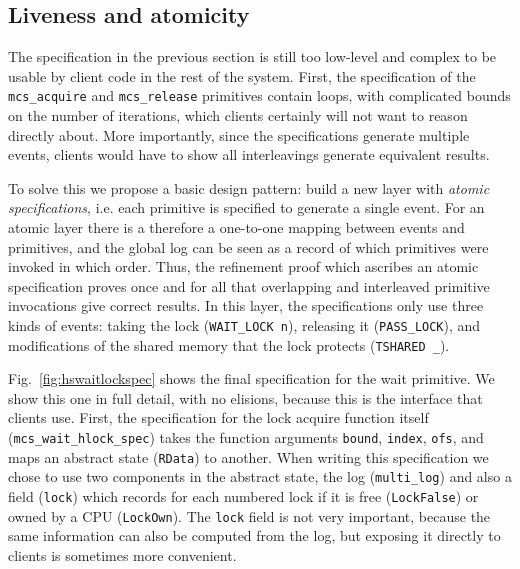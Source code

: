 \subsection{Liveness and atomicity}
\label{sec:liveness-atomicity}

The specification in the previous section is still too low-level and
complex to be usable by client code in the rest of the system.  First,
the specification of the \lstinline$mcs_acquire$ and
\lstinline$mcs_release$ primitives contain loops, with complicated
bounds on the number of iterations, which clients certainly will not
want to reason directly about.  More importantly, since the
specifications generate multiple events, clients would have to show
all interleavings generate equivalent results.

To solve this we propose a basic design
pattern: build a new layer with \emph{atomic specifications},
i.e. each primitive is specified to generate  a single event.
For an atomic layer there is a
therefore a one-to-one mapping between events and primitives, and the global log
can be seen as a record of which primitives were invoked in which
order. Thus, the refinement proof which ascribes an atomic
specification proves once and for all that overlapping and interleaved
primitive invocations give correct results.
In this layer, the specifications only use three kinds 
of events: taking the lock (\lstinline$WAIT_LOCK n$),
releasing it (\lstinline$PASS_LOCK$), and modifications of the shared
memory that the lock protects (\lstinline$TSHARED _$).

Fig.~\ref{fig:hswaitlockspec} shows the final specification for the
wait primitive. We show this one in full detail, with no elisions,
because this is the interface that clients use. First, the
specification for the lock acquire function itself
(\lstinline$mcs_wait_hlock_spec$) takes the function arguments
\lstinline$bound$, \lstinline$index$, \lstinline$ofs$, and maps an
abstract state (\lstinline$RData$) to another. When writing this
specification we chose to use two components in the abstract state, the
log (\lstinline$multi_log$) and also a field (\lstinline$lock$) which
records for each numbered lock if it is free (\lstinline$LockFalse$)
or owned by a CPU (\lstinline$LockOwn$). The \lstinline$lock$ field is
not very important, because the same information can also be computed
from the log, but exposing it directly to clients is sometimes more
convenient.

